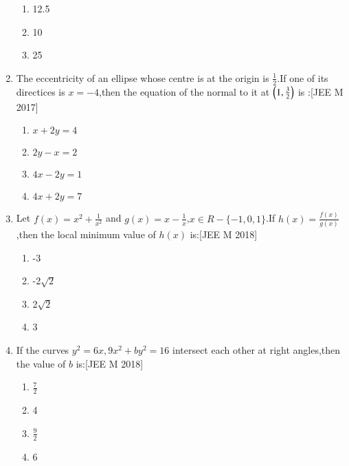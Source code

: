 \documentclass[journal,12pt,twocolumn]{IEEEtran}
\theoremstyle{remark}
\begin{document}
\begin{enumerate}
\begin{enumerate}
    \item  12.5\\
    \item  10\\
    \item  25\\
\end{enumerate}
\item The eccentricity of an ellipse whose centre is at the origin is $\frac{1}{2}$.If one of its directices is $x=-4$,then the equation of the normal to it at $\left(1,\frac{3}{2}\right)$ is :\hfill[JEE M 2017]\\
\begin{enumerate}
    \item  $x+2y=4$\\
    \item  $2y-x=2$\\
    \item  $4x-2y=1$\\
    \item  $4x+2y=7$\\
\end{enumerate}
\item Let $f(x)=x^{2}+\frac{1}{x^2}$ and $g(x)=x-\frac{1}{x}$,$x \in R-{\{-1,0,1}\}$.If $h(x)=\frac{f(x)}{g(x)}$,then the local minimum value of $h(x)$ is:\hfill[JEE M 2018]\\
\begin{enumerate}
    \item  -3\\
    \item  -2$\sqrt{2}$\\
    \item   2$\sqrt{2}$\\
    \item   3\\
\end{enumerate}
\item If the curves $y^2=6x,9x^2+by^2=16$ intersect each other at right angles,then the value of $b$ is:\hfill[JEE M 2018]\\
\begin{enumerate}
    \item  $\frac{7}{2}$\\
    \item  4\\
    \item  $\frac{9}{2}$\\
    \item  6\\
\end{enumerate}
\end{enumerate}
\end{document}

